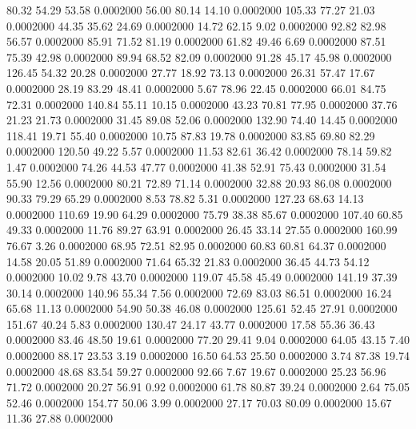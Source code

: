   80.32   54.29   53.58   0.0002000
  56.00   80.14   14.10   0.0002000
 105.33   77.27   21.03   0.0002000
  44.35   35.62   24.69   0.0002000
  14.72   62.15    9.02   0.0002000
  92.82   82.98   56.57   0.0002000
  85.91   71.52   81.19   0.0002000
  61.82   49.46    6.69   0.0002000
  87.51   75.39   42.98   0.0002000
  89.94   68.52   82.09   0.0002000
  91.28   45.17   45.98   0.0002000
 126.45   54.32   20.28   0.0002000
  27.77   18.92   73.13   0.0002000
  26.31   57.47   17.67   0.0002000
  28.19   83.29   48.41   0.0002000
   5.67   78.96   22.45   0.0002000
  66.01   84.75   72.31   0.0002000
 140.84   55.11   10.15   0.0002000
  43.23   70.81   77.95   0.0002000
  37.76   21.23   21.73   0.0002000
  31.45   89.08   52.06   0.0002000
 132.90   74.40   14.45   0.0002000
 118.41   19.71   55.40   0.0002000
  10.75   87.83   19.78   0.0002000
  83.85   69.80   82.29   0.0002000
 120.50   49.22    5.57   0.0002000
  11.53   82.61   36.42   0.0002000
  78.14   59.82    1.47   0.0002000
  74.26   44.53   47.77   0.0002000
  41.38   52.91   75.43   0.0002000
  31.54   55.90   12.56   0.0002000
  80.21   72.89   71.14   0.0002000
  32.88   20.93   86.08   0.0002000
  90.33   79.29   65.29   0.0002000
   8.53   78.82    5.31   0.0002000
 127.23   68.63   14.13   0.0002000
 110.69   19.90   64.29   0.0002000
  75.79   38.38   85.67   0.0002000
 107.40   60.85   49.33   0.0002000
  11.76   89.27   63.91   0.0002000
  26.45   33.14   27.55   0.0002000
 160.99   76.67    3.26   0.0002000
  68.95   72.51   82.95   0.0002000
  60.83   60.81   64.37   0.0002000
  14.58   20.05   51.89   0.0002000
  71.64   65.32   21.83   0.0002000
  36.45   44.73   54.12   0.0002000
  10.02    9.78   43.70   0.0002000
 119.07   45.58   45.49   0.0002000
 141.19   37.39   30.14   0.0002000
 140.96   55.34    7.56   0.0002000
  72.69   83.03   86.51   0.0002000
  16.24   65.68   11.13   0.0002000
  54.90   50.38   46.08   0.0002000
 125.61   52.45   27.91   0.0002000
 151.67   40.24    5.83   0.0002000
 130.47   24.17   43.77   0.0002000
  17.58   55.36   36.43   0.0002000
  83.46   48.50   19.61   0.0002000
  77.20   29.41    9.04   0.0002000
  64.05   43.15    7.40   0.0002000
  88.17   23.53    3.19   0.0002000
  16.50   64.53   25.50   0.0002000
   3.74   87.38   19.74   0.0002000
  48.68   83.54   59.27   0.0002000
  92.66    7.67   19.67   0.0002000
  25.23   56.96   71.72   0.0002000
  20.27   56.91    0.92   0.0002000
  61.78   80.87   39.24   0.0002000
   2.64   75.05   52.46   0.0002000
 154.77   50.06    3.99   0.0002000
  27.17   70.03   80.09   0.0002000
  15.67   11.36   27.88   0.0002000
